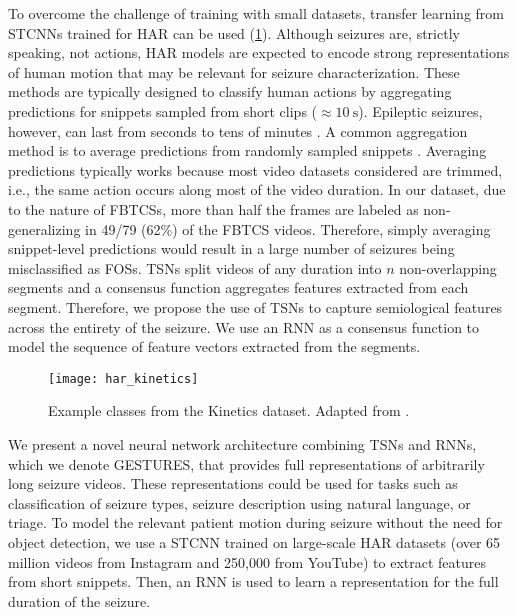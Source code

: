 To overcome the challenge of training with small datasets, transfer learning from \acp{STCNN} trained for \ac{HAR} can be used \cite{karacsony_deep_2020} (\cref{fig:kinetics}).
Although seizures are, strictly speaking, not actions, \ac{HAR} models are expected to encode strong representations of human motion that may be relevant for seizure characterization.
These methods are typically designed to classify human actions by aggregating predictions for snippets sampled from short clips ($\approx \SI{10}{\second}$).
Epileptic seizures, however, can last from seconds to tens of minutes \cite{jenssen_how_2006}.
A common aggregation method is to average predictions from randomly sampled snippets \cite{carreira_quo_2017,ghadiyaram_large-scale_2019,simonyan_two-stream_2014}.
Averaging predictions typically works because most video datasets considered are trimmed, i.e., the same action occurs along most of the video duration.
In our dataset, due to the nature of \acp{FBTCS}, more than half the frames are labeled as non-generalizing in 49/79 (62\%) of the \ac{FBTCS} videos.
Therefore, simply averaging snippet-level predictions would result in a large number of seizures being misclassified as \acp{FOS}.
\Acp{TSN} \cite{wang_temporal_2019} split videos of any duration into $n$ non-overlapping segments and a consensus function aggregates features extracted from each segment.
Therefore, we propose the use of \acp{TSN} to capture semiological features across the entirety of the seizure.
We use an \ac{RNN} as a consensus function to model the sequence of feature vectors extracted from the segments.

\begin{figure}[hbt!]
  \centering
  \texttt{[image: har\_kinetics]}
  \caption[Example classes from the Kinetics dataset]{
    Example classes from the Kinetics dataset.
    Adapted from \cite{kay_kinetics_2017}.
  }\label{fig:kinetics}
\end{figure}


We present a novel neural network architecture combining \acp{TSN} and \acp{RNN}, which we denote \ac{GESTURES}, that provides full representations of arbitrarily long seizure videos.
These representations could be used for tasks such as classification of seizure types, seizure description using natural language, or triage.
To model the relevant patient motion during seizure without the need for object detection, we use a \ac{STCNN} trained on large-scale \ac{HAR} datasets (over 65 million videos from Instagram and 250,000 from YouTube) \cite{ghadiyaram_large-scale_2019} to extract features from short snippets.
Then, an \ac{RNN} is used to learn a representation for the full duration of the seizure.

